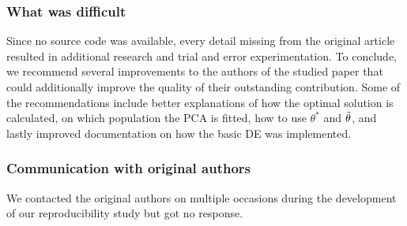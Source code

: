\subsubsection*{What was difficult}
Since no source code was available, every detail missing from the original article resulted in additional research and trial and error experimentation. To conclude, we recommend several improvements to the authors of the studied paper that could additionally improve the quality of their outstanding contribution. Some of the recommendations include better explanations of how the optimal solution is calculated, on which population the PCA is fitted, how to use $\theta^*$ and $\Tilde{\theta}$, and lastly improved documentation on how the basic DE was implemented. 

\subsubsection*{Communication with original authors}

We contacted the original authors on multiple occasions during the development of our reproducibility study but got no response.
